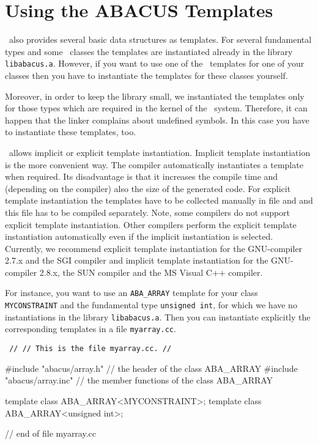 

\section{Using the ABACUS Templates}
\label{section:UsingTemplates}

\ABACUS\ also provides several basic data structures as templates. 
For several fundamental types and some \ABACUS\ classes the templates
are instantiated already in the library {\tt libabacus.a}. 
However, if you want to use one of the \ABACUS\ templates
for one of your classes then you have to instantiate the
templates for these classes yourself. 

Moreover, in order to keep the
library small, we instantiated the templates only for those types
which are required in the kernel of the \ABACUS\ system. Therefore,
it can happen that the linker complains about undefined symbols.
In this case you have to instantiate these templates, too.

\ABACUS\ allows implicit or explicit template instantiation. Implicit
template instantiation is the more convenient way. The compiler
automatically instantiates a template when required. Its disadvantage
is that it increases the compile time and (depending on the compiler)
also the size of the generated code. For explicit template
instantiation the templates have to be collected manually in file and
and this file has to be compiled separately. Note, some compilers do
not support explicit template instantiation. Other compilers perform
the explicit template instantiation automatically even if the implicit
instantiation is selected. Currently, we recommend explicit template
instantiation for the GNU-compiler 2.7.x and the SGI compiler and
implicit template instantiation for the GNU-compiler 2.8.x, the SUN compiler
and the MS Visual C++ compiler.

For instance, you want to use an {\tt ABA\_ARRAY} template for your
class {\tt MYCONSTRAINT} and the fundamental type {\tt unsigned int},
for which we have no instantiations in the library {\tt libabacus.a}.
Then you can instantiate explicitly the corresponding templates in a file
{\tt myarray.cc}.

\bigskip
{\tt\obeylines
//
// This is the file myarray.cc.
//

\#include "abacus/array.h"       // the header of the class ABA\_ARRAY
\#include "abacus/array.inc"     // the member functions of the class ABA\_ARRAY

template class ABA\_ARRAY<MYCONSTRAINT>;
template class ABA\_ARRAY<unsigned int>;

// end of file myarray.cc
}
\bigskip

